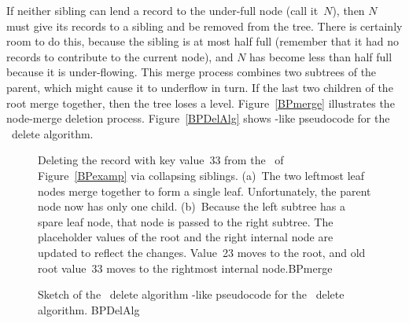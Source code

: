 
If neither sibling can lend a record to the under-full node
(call it~\(N\)),
then \(N\) must give its records to a sibling and be removed
from the tree.
There is certainly room to do this, because the sibling is at most
half full (remember that it had no records to contribute to the
current node), and \(N\) has become less than half full because it is
under-flowing.
This merge process combines two subtrees of the parent, which might
cause it to underflow in turn.
If the last two children of the root merge together, then the tree
loses a level.
Figure~\ref{BPmerge} illustrates the node-merge deletion process.
Figure~\ref{BPDelAlg} shows \Lang-like pseudocode for the
\BPtree\ delete algorithm.

\begin{figure}
\vspace{-\smallskipamount}

{Deleting the record with key value~33 from the \BPtree\ of
Figure~\ref{BPexamp} via collapsing siblings.
(a)~The two leftmost leaf nodes merge together to form a single leaf.
Unfortunately, the parent node now has only one child.
(b)~Because the left subtree has a spare leaf node, that node is passed
to the right subtree.
The placeholder values of the root and the right internal node are
updated to reflect the changes.
Value~23 moves to the root, and old root value~33 moves to the
rightmost internal node.}{BPmerge}
\bigskip
\end{figure}

\begin{figure}
\vspace{-\bigskipamount}

\capt{4.5in}
{Sketch of the \BPtree\ delete algorithm}
{\Lang-like pseudocode for the \BPtree\ delete algorithm.}
{BPDelAlg}
\end{figure}

